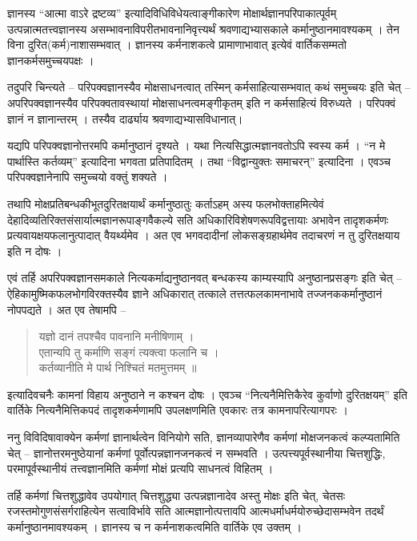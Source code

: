 ज्ञानस्य “आत्मा वाऽरे द्रष्टव्य” इत्यादिविधिविधेयत्वाङ्गीकारेण मोक्षार्थज्ञानपरिपाकात्पूर्वम् उत्पन्नात्मतत्त्वज्ञानस्य असम्भावनाविपरीतभावनानिवृत्त्यर्थं श्रवणाद्यभ्यासकाले कर्मानुष्ठानमावश्यकम् । तेन विना दुरित(कर्म)नाशासम्भवात् । ज्ञानस्य कर्मनाशकत्वे प्रामाणाभावात् इत्येवं वार्तिकसम्मतो ज्ञानकर्मसमुच्चयपक्षः ।

तदुपरि चिन्त्यते – परिपक्वज्ञानस्यैव मोक्षसाधनत्वात् तस्मिन् कर्मसाहित्यासम्भवात् कथं समुच्चयः इति चेत् – अपरिपक्वज्ञानस्यैव परिपक्वतावस्थायां मोक्षसाधनत्वमङ्गीकृतम् इति न कर्मसाहित्यं विरुध्यते । परिपक्वं ज्ञानं न ज्ञानान्तरम् । तस्यैव दार्ढ्याय श्रवणाद्यभ्यासविधानात्।

यद्यपि परिपक्वज्ञानोत्तरमपि कर्मानुष्ठानं दृश्यते । यथा नित्यसिद्धात्मज्ञानवतोऽपि स्वस्य कर्म । “न मे पार्थास्ति कर्तव्यम्” इत्यादिना भगवता प्रतिपादितम् । तथा “विद्वान्युक्तः समाचरन्” इत्यादिना । एवञ्च परिपक्वज्ञानेनापि समुच्चयो वक्तुं शक्यते ।

तथापि मोक्षप्रतिबन्धकीभूतदुरितक्षयार्थं कर्मानुष्ठातुः कर्ताऽहम् अस्य फलभोक्ताहमित्येवं देहादिव्यतिरिक्तसंसार्यात्मज्ञानरूपाङ्गवैकल्ये सति अधिकारिविशेषणरूपविद्वत्तायाः अभावेन तादृशकर्मणः प्रत्यवायक्षयफलानुत्पादात् वैयर्थ्यमेव । अत एव भगवदादीनां लोकसङ्ग्रहार्थमेव तदाचरणं न तु दुरितक्षयाय इति न दोषः ।

एवं तर्हि अपरिपक्वज्ञानसमकाले नित्यकर्माद्यनुष्ठानवत् बन्धकस्य काम्यस्यापि अनुष्ठानप्रसङ्गः इति चेत् – ऐहिकामुष्मिकफलभोगविरक्तस्यैव ज्ञाने अधिकारात् तत्काले तत्तत्फलकामनाभावे तज्जनककर्मानुष्ठानं नोपपद्यते । अत एव तेषामपि –
\begin{verse}
यज्ञो दानं तपश्चैव पावनानि मनीषिणाम् ।\\
एतान्यपि तु कर्माणि सङ्गं त्यक्त्वा फलानि च ।\\
कर्तव्यानीति मे पार्थ निश्चितं मतमुत्तमम् ॥
\end{verse}
इत्यादिवचनैः कामनां विहाय अनुष्ठाने न कश्चन दोषः । एवञ्च “नित्यनैमित्तिकैरेव कुर्वाणो दुरितक्षयम्” इति वार्तिके नित्यनैमित्तिकपदं तादृशकर्मणामपि उपलक्षणमिति एवकारः तत्र कामनापरित्यागपरः ।

ननु विविदिषावाक्येन कर्मणां ज्ञानार्थत्वेन विनियोगे सति, ज्ञानव्यापारेणैव कर्मणां मोक्षजनकत्वं कल्प्यतामिति चेत् – ज्ञानोत्तरमनुष्ठेयानां कर्मणां पूर्वोत्पन्नज्ञानजनकत्वं न सम्भवति । उत्पत्त्यपूर्वस्थानीया चित्तशुद्धिः, परमापूर्वस्थानीयं तत्त्वज्ञानमिति कर्मणां मोक्षं प्रत्यपि साधनत्वं विहितम् ।

तर्हि कर्मणां चित्तशुद्धावेव उपयोगात् चित्तशुद्ध्या उत्पन्नज्ञानादेव अस्तु मोक्षः इति चेत्, चेतसः रजस्तमोगुणसंसर्गराहित्येन सत्वाविर्भावे सति आत्मज्ञानोत्पत्तावपि आत्मधर्माधर्मयोरुच्छेदासम्भवेन तदर्थं कर्मानुष्ठानमावश्यकम् । ज्ञानस्य च न कर्मनाशकत्वमिति वार्तिके एव उक्तम् ।

